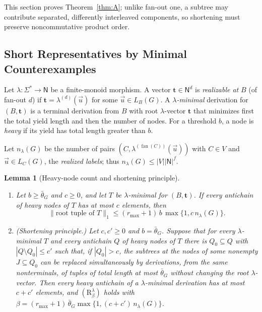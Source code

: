 \documentclass[11pt]{article}
\numberwithin{equation}{section}
\theoremstyle{plain}
\newtheorem{lemma}[theorem]{Lemma}
\theoremstyle{definition}
\theoremstyle{remark}
\newcommand{\tuple}[1]{\vec{#1}}
\newcommand{\fan}{\operatorname{fan}}
\theoremstyle{plain}
\begin{document}
This section proves Theorem~\ref{thm:A}; unlike fan-out one,
a subtree may contribute separated, differently interleaved
components, so shortening must preserve noncommutative product order.

\subsection{Short Representatives by Minimal Counterexamples}
\label{subsec:group-invariants}

Let $\lambda:\Sigma^*\to\mathsf N$ be a finite-monoid morphism.  A vector
$\mathbf t\in\mathsf N^d$ is \emph{realizable at} $B$ (of fan-out $d$) if
$\mathbf t=\lambda^{(d)}(\tuple u)$ for some $\tuple u\in L_B(G)$.  A
\emph{$\lambda$-minimal} derivation for $(B,\mathbf t)$ is a terminal derivation
from $B$ with root $\lambda$-vector $\mathbf t$ that minimizes first the total
yield length and then the number of nodes.  For a threshold $b$, a node is
\emph{heavy} if its yield has total length greater than $b$.

Let $n_\lambda(G)$ be the number of pairs $(C,\lambda^{(\fan(C))}(\tuple u))$ with $C\in V$ and
$\tuple u\in L_C(G)$, the \emph{realized labels}; thus $n_\lambda(G)\le|V||\mathsf N|^f$.

\begin{lemma}[Heavy-node count and shortening principle]
\label{lem:heavy-node-count}
\begin{enumerate}[label=\textup{(\roman*)},leftmargin=*]
\item Let $b\ge\bar\theta_G$ and $c\ge0$, and let $T$ be $\lambda$-minimal for
$(B,\mathbf t)$.  If every antichain of heavy nodes of $T$ has at most $c$
elements, then
\[
 \|\text{root tuple of }T\|_1\le(r_{\max}+1)\,b\,\max\{1,c\,n_\lambda(G)\}.
\]
\item \emph{(Shortening principle.)}  Let $c,c'\ge0$ and $b=\bar\theta_G$.  Suppose that
for every $\lambda$-minimal $T$ and every antichain $Q$ of heavy nodes of $T$ there is
$Q_0\subseteq Q$ with $|Q\setminus Q_0|\le c'$ such that, if $|Q_0|>c$, the subtrees at
the nodes of some nonempty $J\subseteq Q_0$ can be replaced simultaneously by
derivations, from the same nonterminals, of tuples of total length at most
$\bar\theta_G$ without changing the root $\lambda$-vector.  Then every heavy antichain of
a $\lambda$-minimal derivation has at most $c+c'$ elements, and
$(\mathrm R_\beta^\lambda)$ holds with
$\beta=(r_{\max}+1)\,\bar\theta_G\max\{1,(c+c')\,n_\lambda(G)\}$.
\end{enumerate}
\end{lemma}
\end{document}
